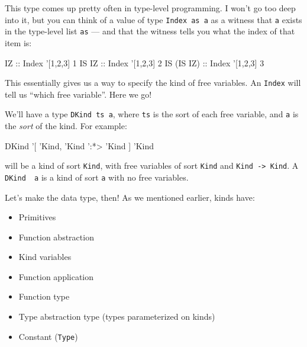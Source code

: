 \documentclass[]{article}
\newenvironment{Shaded}{}{}
\newcommand{\DataTypeTok}[1]{\textcolor[rgb]{0.56,0.13,0.00}{#1}}
\newcommand{\DecValTok}[1]{\textcolor[rgb]{0.25,0.63,0.44}{#1}}
\newcommand{\FunctionTok}[1]{\textcolor[rgb]{0.02,0.16,0.49}{#1}}
\newcommand{\NormalTok}[1]{#1}
\newcommand{\OtherTok}[1]{\textcolor[rgb]{0.00,0.44,0.13}{#1}}
\begin{document}
This type comes up pretty often in type-level programming. I won't go too deep
into it, but you can think of a value of type \texttt{Index\ as\ a} as a witness
that \texttt{a} exists in the type-level list \texttt{as} --- and that the
witness tells you what the index of that item is:

\begin{Shaded}
\begin{Highlighting}[]
\DataTypeTok{IZ}\OtherTok{         ::} \DataTypeTok{Index}\NormalTok{ '[}\DecValTok{1}\NormalTok{,}\DecValTok{2}\NormalTok{,}\DecValTok{3}\NormalTok{] }\DecValTok{1}
\DataTypeTok{IS} \DataTypeTok{IZ}\OtherTok{      ::} \DataTypeTok{Index}\NormalTok{ '[}\DecValTok{1}\NormalTok{,}\DecValTok{2}\NormalTok{,}\DecValTok{3}\NormalTok{] }\DecValTok{2}
\DataTypeTok{IS}\NormalTok{ (}\DataTypeTok{IS} \DataTypeTok{IZ}\NormalTok{)}\OtherTok{ ::} \DataTypeTok{Index}\NormalTok{ '[}\DecValTok{1}\NormalTok{,}\DecValTok{2}\NormalTok{,}\DecValTok{3}\NormalTok{] }\DecValTok{3}
\end{Highlighting}
\end{Shaded}

This essentially gives us a way to specify the kind of free variables. An
\texttt{Index} will tell us ``which free variable''. Here we go!

We'll have a type \texttt{DKind\ ts\ a}, where \texttt{ts} is the sort of each
free variable, and \texttt{a} is the \emph{sort} of the kind. For example:

\begin{Shaded}
\begin{Highlighting}[]
\DataTypeTok{DKind}\NormalTok{ '[ }\DataTypeTok{'Kind}\NormalTok{, }\DataTypeTok{'Kind}\NormalTok{ '}\FunctionTok{:*>} \DataTypeTok{'Kind}\NormalTok{ ] }\DataTypeTok{'Kind}
\end{Highlighting}
\end{Shaded}

will be a kind of sort \texttt{Kind}, with free variables of sort \texttt{Kind}
and \texttt{Kind\ -\textgreater{}\ Kind}. A
\texttt{DKind\ \textquotesingle{}{[}{]}\ a} is a kind of sort \texttt{a} with no
free variables.

Let's make the data type, then! As we mentioned earlier, kinds have:

\begin{itemize}
\tightlist
\item
  Primitives
\item
  Function abstraction
\item
  Kind variables
\item
  Function application
\item
  Function type
\item
  Type abstraction type (types parameterized on kinds)
\item
  Constant (\texttt{Type})
\end{itemize}
\end{document}
